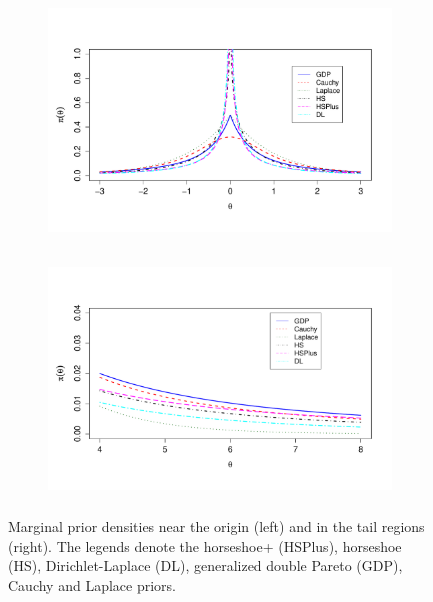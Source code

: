 \documentclass[sts,preprint]{imsart}
\begin{document}
\begin{figure}[ht!]
  \begin{subfigure}{0.45\linewidth}
	\includegraphics[height=2.5in,width=\textwidth]{densities_zero_new}%
	\label{fig:zero}
	\end{subfigure}
	\hspace{0.1in}
  \begin{subfigure}{0.45\linewidth}
	\includegraphics[height=2.5in,width=\textwidth]{densities_tails_new}
  \label{fig:tails}
		\end{subfigure}
 \caption{Marginal prior densities near the origin (left) and in the tail regions (right). The legends denote the horseshoe+ (HSPlus), horseshoe (HS), Dirichlet-Laplace (DL), generalized double Pareto (GDP), Cauchy and Laplace priors.}
\end{figure}
\end{document}
